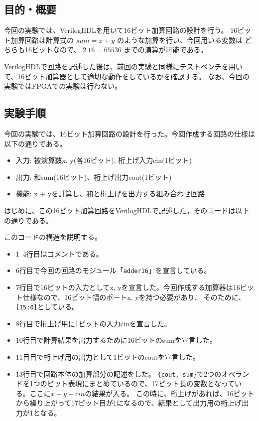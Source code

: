 \documentclass[uplatex]{jsarticle}
\begin{document}
\subsection{目的・概要}

今回の実験では、VerilogHDLを用いて16ビット加算回路の設計を行う。
16ビット加算回路は計算式の $sum = x + y$ のような加算を行い、今回用いる変数は
どちらも16ビットなので、 $2~{16} = 65536$ までの演算が可能である。

VerilogHDLで回路を記述した後は、前回の実験と同様にテストベンチを用いて、16ビット加算器として適切な動作をしているかを確認する。
なお、今回の実験ではFPGAでの実験は行わない。

\subsection{実験手順}

今回の実験では、16ビット加算回路の設計を行った。今回作成する回路の仕様は以下の通りである。

\begin{itemize}
  \item 入力: 被演算数x, y(各16ビット), 桁上げ入力cin(1ビット)
  \item 出力: 和sum(16ビット)、桁上げ出力cout(1ビット)
  \item 機能: x + yを計算し、和と桁上げを出力する組み合わせ回路
\end{itemize}

はじめに、この16ビット加算回路をVerilogHDLで記述した。そのコードは以下の通りである。



このコードの構造を説明する。

\begin{itemize}
  \item 1~4行目はコメントである。
  \item 6行目で今回の回路のモジュール「{\tt adder16}」を宣言している。
  \item 7行目で16ビットの入力としてx, yを宣言した。今回作成する加算器は16ビット仕様なので、16ビット幅のポートx, yを持つ必要があり、
          そのために、{\tt [15:0]}としている。
  \item 8行目で桁上げ用に1ビットの入力cinを宣言した。
  \item 10行目で計算結果を出力するために16ビットのsumを宣言した。
  \item 11目目で桁上げ用の出力として1ビットのcoutを宣言した。
  \item 13行目で回路本体の加算部分の記述をした。
        {\tt \{cout, sum\}}で2つのオペランドを1つのビット表現にまとめているので、17ビット長の変数となっている。ここに$x + y + cin$の結果が入る。
	  この時に、桁上げがあれば、16ビットから繰り上がって17ビット目が1になるので、結果として出力用の桁上げ出力が1となる。
\end{itemize}
\end{document}

